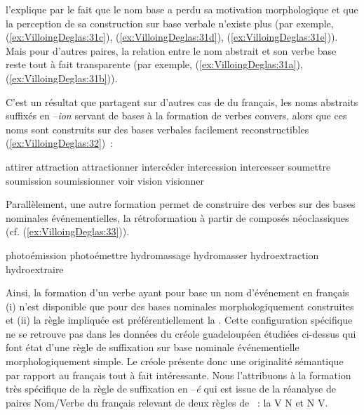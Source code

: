 \documentclass[output=paper]{langsci/langscibook}
\begin{document}
%
\citet{Tribout2010a} %
%
l'explique par le fait que le nom base a perdu sa
motivation morphologique et que la perception de sa construction sur
base verbale n'existe plus (par exemple, (\ref{ex:VilloingDeglas:31c}), (\ref{ex:VilloingDeglas:31d}), (\ref{ex:VilloingDeglas:31e})). Mais pour
d'autres paires, la relation entre le nom abstrait et son verbe base
reste tout à fait transparente (par exemple, (\ref{ex:VilloingDeglas:31a}), (\ref{ex:VilloingDeglas:31b})).

C'est un résultat que partagent %
\citet{Lignon14} %
%
sur d'autres cas
de  du français, les noms abstraits suffixés en --\emph{ion}
servant de bases à la formation de verbes convers, alors que ces noms
sont construits sur des bases verbales facilement reconstructibles
(\ref{ex:VilloingDeglas:32})~:

\newpage
\ea \label{ex:VilloingDeglas:32}
\ea attirer \textrightarrow{~} attraction \textrightarrow{~} attractionner
\ex  intercéder \textrightarrow{~} intercession \textrightarrow{~} intercesser
\ex  soumettre \textrightarrow{~} soumission \textrightarrow{~} soumissionner
\ex  voir \textrightarrow{~} vision \textrightarrow{~} visionner
\z\z

Parallèlement, une autre formation permet de construire des verbes sur
des bases nominales événementielles, la rétroformation à partir de
composés néoclassiques %
\citep{Namer12} %
%
(cf. (\ref{ex:VilloingDeglas:33})).

\ea \label{ex:VilloingDeglas:33}
\ea photoémission \textrightarrow{~} photoémettre
\ex  hydromassage \textrightarrow{~} hydromasser
\ex  hydroextraction \textrightarrow{~} hydroextraire
\z\z

Ainsi, la formation d'un verbe ayant pour base un nom d'événement en
français (i) n'est disponible que pour des bases nominales
morphologiquement construites et (ii) la règle impliquée est
préférentiellement la . Cette configuration spécifique ne se
retrouve pas dans les données du créole guadeloupéen étudiées ci-dessus
qui font état d'une règle de suffixation sur base nominale
événementielle morphologiquement simple. Le créole présente donc une
originalité sémantique par rapport au français tout à fait intéressante.
Nous l'attribuons à la formation très spécifique de la règle de
suffixation en --\emph{é} qui est issue de la réanalyse de paires
Nom/Verbe du français relevant de deux règles de ~: la
 V\textrightarrow{~} N et N\textrightarrow{~} V.
\end{document}
